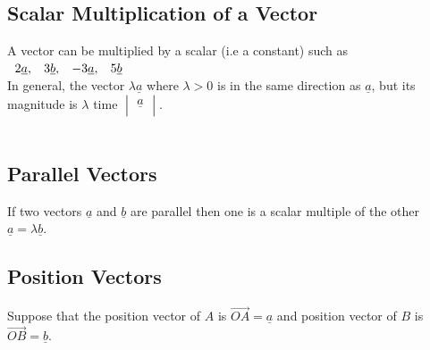 \documentclass[11pt,a4paper]{article}
\begin{document}
\subsection{Scalar Multiplication of a Vector}
A vector can be multiplied by a scalar (i.e a constant) such as $\hspace{0.2cm} 2\underline{a}, \hspace{0.3cm} 3\underline{b}, \hspace{0.3cm} -3\underline{a}, \hspace{0.3cm} 5\underline{b}$\\

In general, the vector $\lambda \underline{a}$ where $\lambda > 0$ is in the same direction as $\underline{a}$, but  its magnitude is $\lambda$  time $\begin{vmatrix}
\underline{a}\\
\end{vmatrix}$.\\\\





\subsection{Parallel Vectors}
If two vectors $\underline{a}$ and $\underline{b}$ are parallel then one is a scalar multiple of the other $\underline{a} = \lambda \underline{b}$.

\begin{figure}[H]
\centering
{}
\end{figure}













\vspace{1cm}
\subsection{Position Vectors}
Suppose that the position vector of $A$ is $\overrightarrow{OA} = \underline{a}$ and position vector of $B$ is $\overrightarrow{OB} = \underline{b}$.
\end{document}
